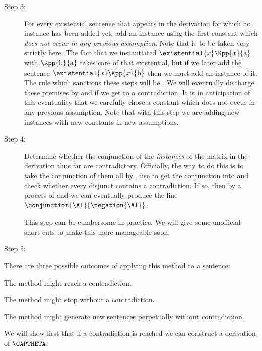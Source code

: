 \begin{description}
\item[Step 3:] For every existential sentence that appears in the derivation for which no instance has been added yet, add an instance using the first constant which \emph{does not occur in any previous assumption}. 
Note that  is to be taken very strictly here. 
The fact that we instantiated $\existential{\variable{x}}\Kpp{\variable{x}}{\constant{a}}$ with $\Kpp{\constant{b}}{\constant{a}}$ takes care of that existential, but if we later add the sentence $\existential{\variable{x}}\Kpp{\variable{x}}{\constant{b}}$ then we must add an instance of it. 
The rule which sanctions these steps will be . 
We will eventually discharge these premises by  and  if we get to a contradiction.
It is in anticipation of this eventuality that we carefully chose a constant which does not occur in any previous assumption.
Note that with this step we are adding new instances with new constants in new assumptions. 

\item[Step 4:] Determine whether the conjunction of the \emph{instances} of the matrix in the derivation thus far are contradictory. 
Officially, the way to do this is to take the conjunction of them all by , use  to get the conjunction into  and check whether every disjunct contains a contradiction. 
If so, then by a process of  and  we can eventually produce the line $\conjunction{\Al}{\negation{\Al}}$. 

This step can be cumbersome in practice. We will give some unofficial short cuts to make this more manageable soon.

\item[Step 5:] \hfill
{}
\end{description}
There are three possible outcomes of applying this method to a sentence:
\begin{cenumerate}
\item The method might reach a contradiction.
\item The method might stop without a contradiction.
\item The method might generate new sentences perpetually without contradiction.
\end{cenumerate}
We will show first that if a contradiction is reached we can construct a derivation of $\CAPTHETA$. 

